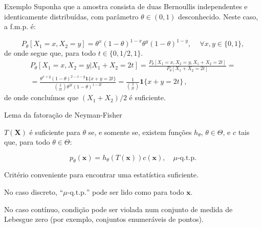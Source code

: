 \documentclass[11pt]{beamer}
\newenvironment{halfwideitemize}{\itemize\addtolength{\itemsep}{0.5em}}{\enditemize}
\begin{document}
	\begin{frame}{Exemplo}
		Suponha que a amostra consista de duas Bernoullis independentes e identicamente distribuídas, com parâmetro $\theta \in (0,1)$ desconhecido. Neste caso, a f.m.p. é:
		
		$$P_\theta[X_1 = x, X_2 = y] = \theta^x (1-\theta)^{1-x} \theta^y (1-\theta)^{1-y},\, \quad \forall x,y \in \{0,1\},$$
		de onde segue que, para todo $t \in \{0,1/2,1\}$.
		\begin{equation*}
			\begin{aligned}         
				P_\theta[X_1 = x, X_2 = y| X_1 +  X_2 =  2 t] = \frac{P_\theta[X_1 = x, X_2 = y, X_1 +  X_2 =  2 t]}{P_\theta[X_1 +  X_2 =  2 t]} = \\
				= \frac{\theta^{x+y} (1-\theta)^{2-x-y}\mathbf{1}\{x+y = 2t\}}{\binom{2}{2t} \theta^{2t}(1-\theta)^{1-2t}}= \frac{1}{\binom{2}{2t} } \mathbf{1}\{x+y = 2t\} \, ,
			\end{aligned}
		\end{equation*}
		de onde concluímos que $(X_1+X_2)/2$ é suficiente.
	\end{frame}
	\begin{frame}{Lema da fatoração de Neyman-Fisher}
		\begin{lemma}
			$T(\boldsymbol{X})$ é suficiente para $\theta$ se, e somente se, existem funções $h_\theta$, $\theta \in \Theta$, e $c$ tais que, para todo $\theta \in \Theta$:
			
			$$p_\theta(\boldsymbol{x}) = h_\theta(T(\boldsymbol{x}) )c(\boldsymbol{x}), \quad \mu\text{-q.t.p.}$$
		\end{lemma}
		
		\begin{halfwideitemize}
			\item Critério conveniente para encontrar uma estatística suficiente.
			\begin{halfwideitemize}
				\item No caso discreto, ``$\mu\text{-q.t.p.}$'' pode ser lido como para todo $\boldsymbol{x}$.
				\item No caso contínuo, condição pode ser violada num conjunto de medida de Lebesgue zero (por exemplo, conjuntos enumeráveis de pontos).
			\end{halfwideitemize}
		\end{halfwideitemize}
		
	\end{frame}
	
\end{document}
